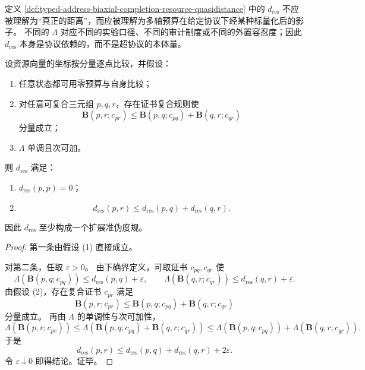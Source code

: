 定义 \ref{def:typed-address-biaxial-completion-resource-quasidistance} 中的 \(d_{\mathrm{res}}\) 不应被理解为“真正的距离”，而应被理解为多轴预算在给定协议下经某种标量化后的影子。
不同的 \(\Lambda\) 对应不同的实验口径、不同的审计制度或不同的外置容忍度；因此 \(d_{\mathrm{res}}\) 本身是协议依赖的，而不是超协议的本体量。

\begin{proposition}[资源准距离的扩展准伪度规性]\label{prop:typed-address-biaxial-completion-resource-quasidistance}
设资源向量的坐标按分量逐点比较，并假设：
\begin{enumerate}
  \item 任意状态都可用零预算与自身比较；
  \item 对任意可复合三元组 \(p,q,r\)，存在证书复合规则使
  \[
  \mathbf B(p,r;c_{pr})
  \le
  \mathbf B(p,q;c_{pq})+\mathbf B(q,r;c_{qr})
  \]
  分量成立；
  \item \(\Lambda\) 单调且次可加。
\end{enumerate}
则 \(d_{\mathrm{res}}\) 满足：
\begin{enumerate}
  \item \(d_{\mathrm{res}}(p,p)=0\)；
  \item
  \[
  d_{\mathrm{res}}(p,r)\le d_{\mathrm{res}}(p,q)+d_{\mathrm{res}}(q,r).
  \]
\end{enumerate}
因此 \(d_{\mathrm{res}}\) 至少构成一个扩展准伪度规。
\end{proposition}

\begin{proof}
第一条由假设 (1) 直接成立。

对第二条，任取 \(\varepsilon>0\)。
由下确界定义，可取证书 \(c_{pq},c_{qr}\) 使
\[
\Lambda(\mathbf B(p,q;c_{pq}))
\le d_{\mathrm{res}}(p,q)+\varepsilon,
\qquad
\Lambda(\mathbf B(q,r;c_{qr}))
\le d_{\mathrm{res}}(q,r)+\varepsilon.
\]
由假设 (2)，存在复合证书 \(c_{pr}\) 满足
\[
\mathbf B(p,r;c_{pr})
\le
\mathbf B(p,q;c_{pq})+\mathbf B(q,r;c_{qr})
\]
分量成立。
再由 \(\Lambda\) 的单调性与次可加性，
\[
\Lambda(\mathbf B(p,r;c_{pr}))
\le
\Lambda(\mathbf B(p,q;c_{pq})+\mathbf B(q,r;c_{qr}))
\le
\Lambda(\mathbf B(p,q;c_{pq}))+\Lambda(\mathbf B(q,r;c_{qr})).
\]
于是
\[
d_{\mathrm{res}}(p,r)
\le
d_{\mathrm{res}}(p,q)+d_{\mathrm{res}}(q,r)+2\varepsilon.
\]
令 \(\varepsilon\downarrow 0\) 即得结论。证毕。
\end{proof}

